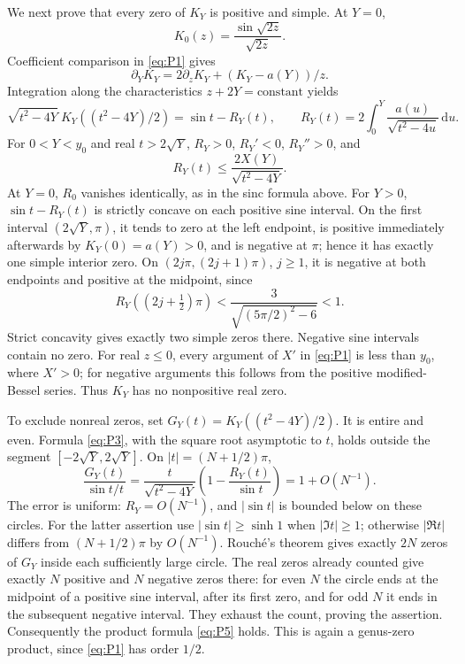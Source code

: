 We next prove that every zero of \(K_Y\) is positive and simple. At
\(Y=0\), \[
 K_0(z)=\frac{\sin\sqrt{2z}}{\sqrt{2z}}.
\] Coefficient comparison in \eqref{eq:P1} gives \[
 \partial_YK_Y=2\partial_zK_Y+(K_Y-a(Y))/z.
\] Integration along the characteristics \(z+2Y=\text{constant}\) yields
\begin{equation}
\sqrt{t^2-4Y}\ K_Y((t^2-4Y)/2)=\sin t-R_Y(t),\qquad
 R_Y(t)=2\int_0^Y\frac{a(u)}{\sqrt{t^2-4u}}\,\mathrm{d}u.       \label{eq:P3}
\end{equation} For \(0<Y<y_0\) and real \(t>2\sqrt Y\), \(R_Y>0\), \(R_Y'<0\), \(R_Y''>0\), and \[
 R_Y(t)\le\frac{2X(Y)}{\sqrt{t^2-4Y}}.
\] At \(Y=0\), \(R_0\) vanishes identically, as in the sinc formula above. For \(Y>0\), \(\sin t-R_Y(t)\) is strictly concave on each positive
sine interval. On the first interval \((2\sqrt Y,\pi)\), it tends to
zero at the left endpoint, is positive immediately afterwards by
\(K_Y(0)=a(Y)>0\), and is negative at \(\pi\); hence it has exactly one
simple interior zero. On \((2j\pi,(2j+1)\pi)\), \(j\ge1\), it is
negative at both endpoints and positive at the midpoint, since \[
 R_Y((2j+\tfrac12)\pi)
 <\frac3{\sqrt{(5\pi/2)^2-6}}<1.
\] Strict concavity gives exactly two simple zeros there. Negative sine
intervals contain no zero. For real \(z\le0\), every argument of \(X'\)
in \eqref{eq:P1} is less than \(y_0\), where \(X'>0\); for negative arguments
this follows from the positive modified-Bessel series. Thus \(K_Y\) has
no nonpositive real zero.

To exclude nonreal zeros, set \(G_Y(t)=K_Y((t^2-4Y)/2)\). It is entire
and even. Formula \eqref{eq:P3}, with the square root asymptotic to \(t\), holds
outside the segment \([-2\sqrt Y,2\sqrt Y]\). On \(|t|=(N+1/2)\pi\), \begin{equation}
\frac{G_Y(t)}{\sin t/t}
 =\frac t{\sqrt{t^2-4Y}}
    \left(1-\frac{R_Y(t)}{\sin t}\right)=1+O(N^{-1}).   \label{eq:P4}
\end{equation} The error is uniform: \(R_Y=O(N^{-1})\), and \(|\sin t|\) is bounded
below on these circles. For the latter assertion use
\(|\sin t|\ge\sinh1\) when \(|\Im t|\ge1\); otherwise \(|\Re t|\)
differs from \((N+1/2)\pi\) by \(O(N^{-1})\). Rouché's theorem gives
exactly \(2N\) zeros of \(G_Y\) inside each sufficiently large circle.
The real zeros already counted give exactly \(N\) positive and \(N\)
negative zeros there: for even \(N\) the circle ends at the midpoint of
a positive sine interval, after its first zero, and for odd \(N\) it
ends in the subsequent negative interval. They exhaust the count,
proving the assertion. Consequently the product formula \eqref{eq:P5}
holds. This is again a genus-zero product, since \eqref{eq:P1} has order \(1/2\).

